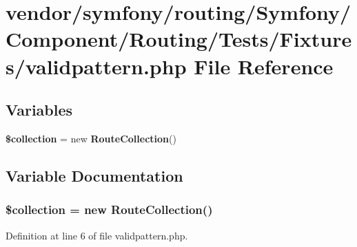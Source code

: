 \section{vendor/symfony/routing/\+Symfony/\+Component/\+Routing/\+Tests/\+Fixtures/validpattern.php File Reference}
\label{validpattern_8php}
\subsection*{Variables}
\begin{DoxyCompactItemize}
\item 
{\bf \$collection} = new {\bf Route\+Collection}()
\end{DoxyCompactItemize}


\subsection{Variable Documentation}
\subsubsection[{\$collection}]{ \$collection = new {\bf Route\+Collection}()}\label{validpattern_8php_ab5ff1e0b2db362eeb5ee5f8ac51c3662}


Definition at line 6 of file validpattern.\+php.

